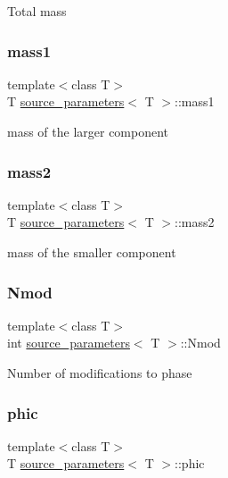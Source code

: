Total mass \mbox{\label{structsource__parameters_a1a222ddfbc43359da566d085d92e7b72}} 
\subsubsection{\texorpdfstring{mass1}{mass1}}
{\footnotesize\ttfamily template$<$class T$>$ \\
T \hyperlink{structsource__parameters}{source\+\_\+parameters}$<$ T $>$\+::mass1}

mass of the larger component \mbox{\label{structsource__parameters_a889d5e8ae96cec656504784f19916b5d}} 
\subsubsection{\texorpdfstring{mass2}{mass2}}
{\footnotesize\ttfamily template$<$class T$>$ \\
T \hyperlink{structsource__parameters}{source\+\_\+parameters}$<$ T $>$\+::mass2}

mass of the smaller component \mbox{\label{structsource__parameters_a0c0678c3881ae1e62819c685b119d065}} 
\subsubsection{\texorpdfstring{Nmod}{Nmod}}
{\footnotesize\ttfamily template$<$class T$>$ \\
int \hyperlink{structsource__parameters}{source\+\_\+parameters}$<$ T $>$\+::Nmod}

Number of modifications to phase \mbox{\label{structsource__parameters_a60cbeb524afa4f18cc5c47b0b43c3c18}} 
\subsubsection{\texorpdfstring{phic}{phic}}
{\footnotesize\ttfamily template$<$class T$>$ \\
T \hyperlink{structsource__parameters}{source\+\_\+parameters}$<$ T $>$\+::phic}

